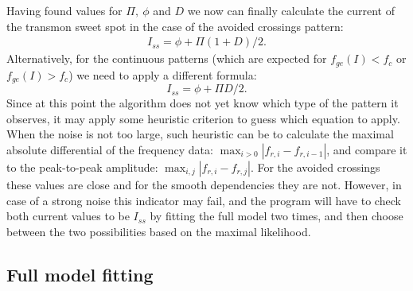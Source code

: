 \documentclass[%
 aip,
 amsmath,amssymb,
 reprint,%
]{revtex4-1}
\begin{document}
Having found values for $\Pi,\ \phi$ and $D$ we now can finally calculate the current of the transmon sweet spot in the case of the avoided crossings pattern:
\begin{align*}
I_{ss} = 
 \phi + \Pi (1+D)/2.
\end{align*}
Alternatively, for the continuous patterns (which are expected for $f_{ge}(I)<f_c$ or  $f_{ge}(I)>f_c$) we need to apply a different formula:
\begin{equation*}
I_{ss} = \phi + \Pi D/2.
\end{equation*}
Since at this point the algorithm does not yet know which type of the pattern it observes, it may apply some heuristic criterion to guess which equation to apply. When the noise is not too large, such heuristic can be to calculate the maximal absolute differential of the frequency data: $\max_{i>0} |f_{r,i} - f_{{r,i}-1}|$, and compare it to the peak-to-peak amplitude: $\max_{i,j} | f_{r,i} - f_{r, j}|$. For the avoided crossings these values are close and for the smooth dependencies they are not. However, in case of a strong noise this indicator may fail, and the program will have to check both current values to be $I_{ss}$ by fitting the full model two times, and then choose between the two possibilities based on the maximal likelihood.


\subsection{Full model fitting}
\end{document}
